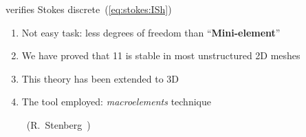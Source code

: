 \begin{frame}{ verifies Stokes discrete~(\ref{eq:stokes:ISh}) }
  \begin{enumerate}\itemsep0.66em
  \item Not easy task: less degrees of freedom than ``\textbf{Mini-element}'' \exclamation
  \item We have proved that 11 is stable in most
    unstructured 2D meshes
  \item This theory has been extended to 3D
  \item The tool employed: \textit{\alert{macroelements}} technique
    \par~\hfill\small(R.~Stenberg~\cite{Stenberg:84,Stenberg:90})
  \end{enumerate}
\end{frame}


\newcommand{\macroCondition}{\emph{macro-condition}\xspace}
\newcommand{\macroelemA}[2]{
  \def\yCoordA{#1}
  \def\yCoordB{#2}
  \begin{tikzpicture}
    \def\nv{4}
    \def\ix{1.6}\def\iy{1}
    \def\vertices{
      \coordinate (q0) at (0,0) [label=120:\scriptsize$q_0$];
      \coordinate (q1) at (-\ix*0.25,\iy);
      \coordinate  (q2) at  (-\ix,-0.25*\iy);
      \coordinate  (q3) at  (0.75*\ix,-\iy);
      \coordinate  (q4) at (\ix*1,0.25*\iy);
    }
    \def\showPoints{
      \foreach \i in {0,...,\nv}
        \fill [black] (q\i) circle (3pt);
    }
    \def\showLines{
      \draw (q1) -- (q2) -- (q3) -- (q4) -- cycle;
      \foreach \i in {1,...,\nv} {
        \draw (q\i) -- (q0);
      }
    }
    \def\showTriangles{
      \node at ($ (q0)!.5!(q1) $) [label=0:\scriptsize${T_1}$] {};
      \node at ($ (q0)!.5!(q2) $) [label=90:\scriptsize${T_2}$] {};
      \node at ($ (q0)!.5!(q3) $) [label=180:\scriptsize${T_3}$] {};
      \node at ($ (q0)!.5!(q4) $) [label=-90:\scriptsize${T_4}$] {};
    }
    \vertices
    \showPoints
    \showLines
    \showTriangles
  \end{tikzpicture}
}

